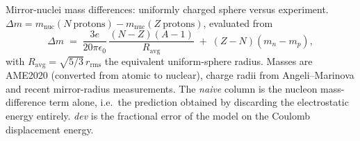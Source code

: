 \documentclass[11pt]{article}
\begin{document}
\begin{table}[htbp]
\centering
\small
\setlength{\tabcolsep}{7pt}
\renewcommand{\arraystretch}{1.08}

\caption{Mirror-nuclei mass differences: uniformly charged sphere versus
experiment. $\Delta m = m_{\mathrm{nuc}}(N\ \mathrm{protons}) -
m_{\mathrm{nuc}}(Z\ \mathrm{protons})$, evaluated from
\[
  \Delta m \;=\; \frac{3e}{20\pi\epsilon_{0}}\,
  \frac{(N-Z)(A-1)}{R_{\mathrm{avg}}} \;+\; (Z-N)(m_{n}-m_{p}),
\]
with $R_{\mathrm{avg}} = \sqrt{5/3}\,r_{\mathrm{rms}}$ the equivalent
uniform-sphere radius. Masses are AME2020 (converted from atomic to nuclear),
charge radii from Angeli--Marinova and recent mirror-radius measurements.
The \emph{naive} column is the nucleon mass-difference term alone, i.e.\ the
prediction obtained by discarding the electrostatic energy entirely.
\emph{dev} is the fractional error of the model on the Coulomb displacement
energy.}
\label{tab:mirror}


\end{table}
\end{document}
